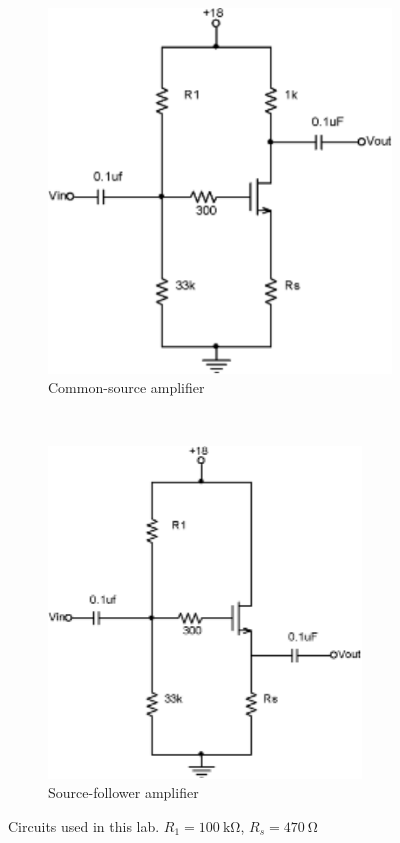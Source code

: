 \begin{figure}[hbtp]
  \centering
  \begin{subfigure}[b]{0.4\textwidth}
    \includegraphics[width=\textwidth]{common-source}
    \caption{\label{schem:common-source} Common-source amplifier}
  \end{subfigure}%
  ~
  \begin{subfigure}[b]{0.4\textwidth}
    \includegraphics[width=\textwidth]{source-follower}
    \caption{\label{schem:source-follower} Source-follower amplifier}
  \end{subfigure}
  \caption{\label{fig:schematics} Circuits used in this lab. $R_1=\SI{100}{\kilo\ohm}$,  $R_s=\SI{470}{\ohm}$}
\end{figure}

